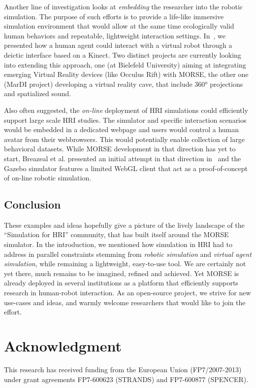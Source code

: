 \documentclass{llncs}
\begin{document}
Another line of investigation looks at \emph{embedding} the researcher into the
robotic simulation. The purpose of such efforts is to provide a life-like
immersive simulation environment that would allow at the same time ecologically
valid human behaviors and repeatable, lightweight interaction settings.
In~\cite{lemaignan2012morse}, we presented how a human agent could interact with
a virtual robot through a deictic interface based on a Kinect. Two distinct
projects are currently looking into extending this approach, one (at Bielefeld
University) aiming at integrating emerging Virtual Reality devices (like Occulus
Rift) with MORSE, the other one (MarDI project) developing a virtual reality
cave, that include 360° projections and spatialized sound.

Also often suggested, the \emph{on-line} deployment of HRI simulations could
efficiently support large scale HRI studies. The simulator and specific
interaction scenarios would be embedded in a dedicated webpage and users would
control a human avatar from their webbrowsers. This would potentially enable
collection of large behavioral datasets. While MORSE development in that
direction has yet to start, Breazeal et al. presented an initial attempt in that
direction in~\cite{breazeal2013crowdsourcing} and the Gazebo simulator features
a limited WebGL client that act as a proof-of-concept of on-line robotic
simulation.


\subsection*{Conclusion}

These examples and ideas hopefully give a picture of the lively landscape of the
``Simulation for HRI'' community, that has built itself around the MORSE
simulator.  In the introduction, we mentioned how simulation in HRI had to
address in parallel constraints stemming from \emph{robotic simulation} and
\emph{virtual agent simulation}, while remaining a lightweight, easy-to-use
tool. We are certainly not yet there, much remains to be imagined, refined and
achieved.  Yet MORSE is already deployed in several institutions as a platform
that efficiently supports research in human-robot interaction. As an open-source
project, we strive for new use-cases and ideas, and warmly welcome researchers
that would like to join the effort.


\section*{Acknowledgment}

This research has received funding from the European
Union (FP7/2007-2013) under grant agreements
FP7-600623 (STRANDS) and FP7-600877 (SPENCER).



\end{document}
